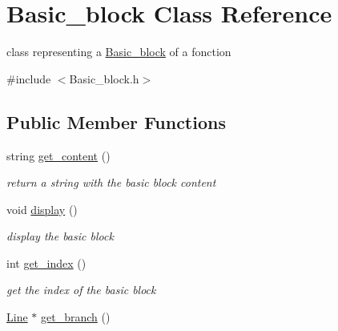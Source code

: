 \hypertarget{class_basic__block}{}\section{Basic\+\_\+block Class Reference}
\label{class_basic__block}


class representing a \mbox{\hyperlink{class_basic__block}{Basic\+\_\+block}} of a fonction  




{\ttfamily \#include $<$Basic\+\_\+block.\+h$>$}

\subsection*{Public Member Functions}
\begin{DoxyCompactItemize}
\item 
\mbox{\label{class_basic__block_a9c0db81ea09b9aa4e4cdb77cbaf90bdd}} 
string \mbox{\hyperlink{class_basic__block_a9c0db81ea09b9aa4e4cdb77cbaf90bdd}{get\+\_\+content}} ()
\begin{DoxyCompactList}\small\item\em return a string with the basic block content \end{DoxyCompactList}\item 
\mbox{\label{class_basic__block_aad79779b098ba4ccd1549a8dbbd80d7d}} 
void \mbox{\hyperlink{class_basic__block_aad79779b098ba4ccd1549a8dbbd80d7d}{display}} ()
\begin{DoxyCompactList}\small\item\em display the basic block \end{DoxyCompactList}\item 
\mbox{\label{class_basic__block_a8cb196904537be8fb0474afce7c769c1}} 
int \mbox{\hyperlink{class_basic__block_a8cb196904537be8fb0474afce7c769c1}{get\+\_\+index}} ()
\begin{DoxyCompactList}\small\item\em get the index of the basic block \end{DoxyCompactList}\item 
\mbox{\label{class_basic__block_a0c0dbb20d9a86ab80878d168642b7cce}} 
\mbox{\hyperlink{class_line}{Line}} $\ast$ \mbox{\hyperlink{class_basic__block_a0c0dbb20d9a86ab80878d168642b7cce}{get\+\_\+branch}} ()

\end{DoxyCompactItemize}
